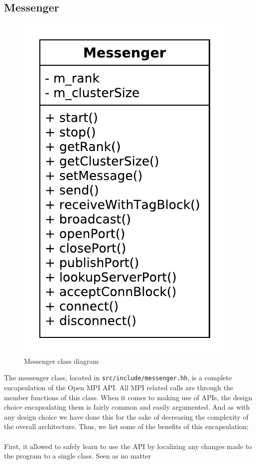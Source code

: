 \documentclass[11pt]{article}
\begin{document}
\subsection{Messenger}
\begin{figure}[H]
  \centering
  \includegraphics[scale=0.5]{image/messenger.pdf}
  \caption{Messenger class diagram}
\end{figure}
The messenger class, located in \texttt{src/include/messenger.hh}, is a complete
encapsulation of the Open MPI API. All MPI related calls are through the member
functions of this class. When it comes to making use of APIs, the design choice
encapsulating them is fairly common and easily argumented. And as with any
design choice we have done this for the sake of decreasing the complexity of the
overall architecture. Thus, we list some of the benefits of this
encapsulation;\\\\First, it allowed to safely learn to use the API by
localizing any changes made to the program to a single class. Seen as no matter
\end{document}
